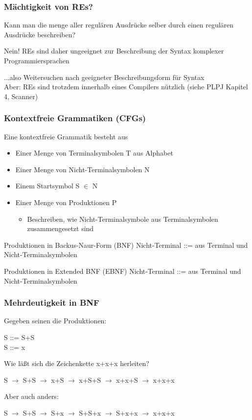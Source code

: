 \subsubsection*{Mächtigkeit von REs?}
\begin{grayInfoBox}
	Kann man die menge aller regulären Ausdrücke selber durch einen regulären Ausdrücke beschreiben?
\end{grayInfoBox}
\begin{defBox}
	Nein! REs sind daher ungeeignet zur Beschreibung der Syntax komplexer Programmiersprachen
\end{defBox}
...also Weitersuchen nach geeigneter Beschreibungsform für Syntax\\
Aber: REs sind trotzdem innerhalb eines Compilers nützlich (siehe PLPJ Kapitel 4, Scanner)
\subsubsection*{Kontextfreie Grammatiken (CFGs)}
Eine kontextfreie Grammatik besteht aus 
\begin{itemize}
	\item Einer Menge von Terminalsymbolen T aus Alphabet
	\item Einer Menge von Nicht-Terminalsymbolen N
	\item Einem Startsymbol S $\in$ N
	\item Einer Menge von Produktionen P
	\begin{itemize}
		\item Beschreiben, wie Nicht-Terminalsymbole aus Terminalsymbolen zusammengesetzt sind
	\end{itemize}
\end{itemize}
\begin{grayInfoBox}
	Produktionen in Backus-Naur-Form (BNF)
	Nicht-Terminal ::=  aus Terminal und Nicht-Terminalsymbolen
\end{grayInfoBox}
\begin{grayInfoBox}
	Produktionen in Extended BNF (EBNF)
	Nicht-Terminal ::=  aus Terminal und Nicht-Terminalsymbolen
\end{grayInfoBox}

\subsubsection*{Mehrdeutigkeit in BNF}
Gegeben seinen die Produktionen:\\
\begin{center}
	S ::= S+S\\
	S ::= x
\end{center}
Wie läßt sich die Zeichenkette x+x+x herleiten?
\begin{center}
	S $\rightarrow$ S+S $\rightarrow$ x+S $\rightarrow$ x+S+S $\rightarrow$ x+x+S $\rightarrow$ x+x+x
\end{center}
Aber auch anders:
\begin{center}
	S $\rightarrow$ S+S $\rightarrow$ S+x $\rightarrow$ S+S+x $\rightarrow$ S+x+x $\rightarrow$ x+x+x
\end{center}

